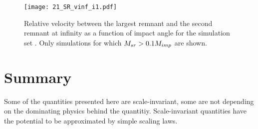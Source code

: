 {\begin{landscape}
\begin{figure}
\begin{center}
\texttt{[image: 21\_SR\_vinf\_i1.pdf]}
\caption{Relative velocity between the largest remnant and the second remnant at infinity as a function of impact angle for the simulation set \iss. Only simulations for which $M_{sr} > 0.1 M_{imp}$ are shown.}
\label{ch03_fig21c}
\end{center}
\end{figure}

\end{landscape}
}

\section{Summary}
Some of the quantities presented here are scale-invariant, some are not depending on the dominating physics behind the quantitiy. Scale-invariant quantities have the potential to be approximated by simple scaling laws.

